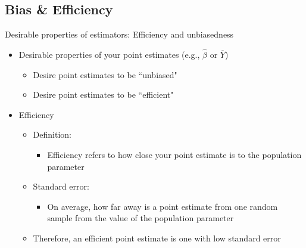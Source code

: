 \subsection[Bias \& Efficiency]{Bias \& Efficiency}

\begin{frame}{Desirable properties of estimators: Efficiency and unbiasedness}
	\begin{itemize}
	\item Desirable properties of your point estimates (e.g., $\hat{\beta}$ or $\overline{Y}$)
		\begin{itemize}
		\item Desire point estimates to be ``unbiased"
		\item Desire point estimates to be ``efficient"
		\end{itemize}
	\item Efficiency 
		\begin{itemize}
		\item Definition:
			\begin{itemize}
			\item Efficiency refers to how close your point estimate is to the population parameter
			\end{itemize}
		\item Standard error:
			\begin{itemize}
			\item On average, how far away is a point estimate from one random sample from the value of the population parameter			
			\end{itemize}
		\item Therefore, an efficient point estimate is one with low standard error
		\end{itemize}	
	\end{itemize}
\end{frame} 

